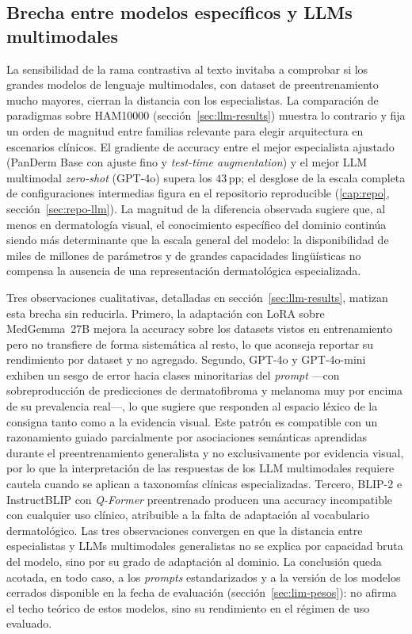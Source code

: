 \subsection{Brecha entre modelos específicos y LLMs multimodales}
\label{sec:disc-llm}

La sensibilidad de la rama contrastiva al texto invitaba a
comprobar si los grandes modelos de lenguaje multimodales, con
dataset de preentrenamiento mucho mayores, cierran la distancia con
los especialistas. La comparación de paradigmas sobre HAM10000
(sección~\ref{sec:llm-results}) muestra lo contrario y fija un orden de
magnitud entre familias relevante para elegir arquitectura en
escenarios clínicos. El gradiente de accuracy entre el mejor
especialista ajustado (PanDerm Base con ajuste fino y \emph{test-time
augmentation}) y el mejor LLM multimodal \emph{zero-shot} (GPT-4o)
supera los $43$\,pp; el desglose de la escala completa de
configuraciones intermedias figura en el repositorio reproducible
(\ref{cap:repo}, sección~\ref{sec:repo-llm}). La magnitud de la diferencia observada
sugiere que, al menos en dermatología visual, el conocimiento específico
del dominio continúa siendo más determinante que la escala general del
modelo: la disponibilidad de miles de millones de parámetros y de
grandes capacidades lingüísticas no compensa la ausencia de una
representación dermatológica especializada.

Tres observaciones cualitativas, detalladas en
sección~\ref{sec:llm-results}, matizan esta brecha sin reducirla.
Primero, la adaptación con LoRA sobre MedGemma~27B mejora la accuracy
sobre los datasets vistos en entrenamiento pero no transfiere de forma
sistemática al resto, lo que aconseja reportar su rendimiento por dataset
y no agregado. Segundo, GPT-4o y GPT-4o-mini exhiben un sesgo de error
hacia clases minoritarias del \emph{prompt} ---con sobreproducción de
predicciones de dermatofibroma y melanoma muy por encima de su prevalencia
real---, lo que sugiere que responden al espacio léxico de la consigna
tanto como a la evidencia visual. Este patrón es compatible con un
razonamiento guiado parcialmente por asociaciones semánticas aprendidas
durante el preentrenamiento generalista y no exclusivamente por evidencia
visual, por lo que la interpretación de las respuestas de los LLM
multimodales requiere cautela cuando se aplican a taxonomías clínicas
especializadas. Tercero, BLIP-2 e InstructBLIP con
\emph{Q-Former} preentrenado producen una accuracy incompatible con
cualquier uso clínico, atribuible a la falta de adaptación al vocabulario
dermatológico. Las tres observaciones convergen en que la distancia entre
especialistas y LLMs multimodales generalistas no se explica por capacidad
bruta del modelo, sino por su grado de adaptación al dominio. La
conclusión queda acotada, en todo caso, a los \emph{prompts}
estandarizados y a la versión de los modelos cerrados disponible en la
fecha de evaluación (sección~\ref{sec:lim-pesos}): no afirma el techo
teórico de estos modelos, sino su rendimiento en el régimen de uso
evaluado.

